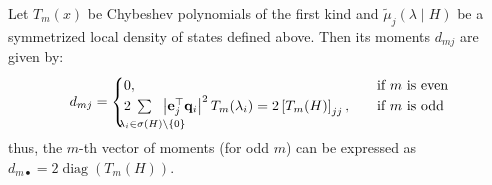 \documentclass[10pt,a4paper]{amsart}
\DeclareMathOperator{\diag}{diag}
\renewcommand*{\b}[1]{\mathbf{#1}}
\begin{document}
\begin{lemma}
	Let \( T_m(x)\) be Chybeshev polynomials of the first kind and \(\tilde \mu_j (\lambda \mid H )\) be a symmetrized local density of states defined above. Then its moments \( d_{mj}\) are given by:
	\begin{equation}%
		d_{mj} = \begin{cases}
			0,                            & \quad \text{if } m \text{ is even} \\
			2\; \sum_{\mathclap{\substack{ \vspace{9pt}                        \\ \lambda_i \in \sigma(H)\backslash \{ 0 \}}}} \;\; \left| \b e_j^\top \b q_i \right|^2  T_m(\lambda_i) =
			2 \left[ T_m(H) \right]_{jj}, & \quad  \text{if } m \text{ is odd} \\
		\end{cases}
	\end{equation}
	thus, the $m$-th vector of moments (for odd \(m\)) can be expressed as $d_{m\bullet} = 2 \diag( T_m(H) )$.
\end{lemma}
\end{document}
